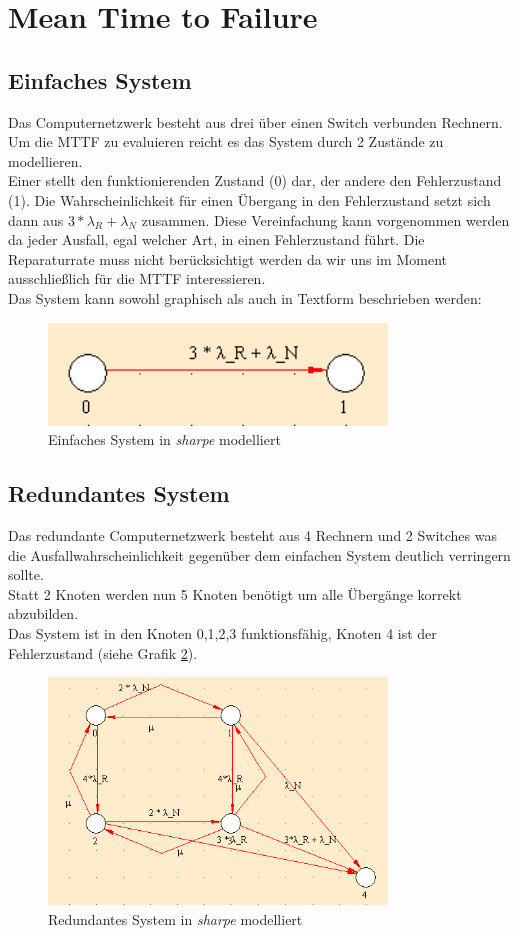 \documentclass[10pt,a4paper]{article}
\begin{document}
\section{Mean Time to Failure} 
\label{sec:mttf}
\subsection{Einfaches System}
Das Computernetzwerk besteht aus drei über einen Switch verbunden Rechnern.
\\
Um die MTTF zu evaluieren reicht es das System durch 2 Zustände zu modellieren. \\
Einer stellt den funktionierenden Zustand (0) dar, der andere den Fehlerzustand (1).
Die Wahrscheinlichkeit für einen Übergang in den Fehlerzustand setzt sich dann aus $3*\lambda_R + \lambda_N$ zusammen. Diese Vereinfachung kann vorgenommen werden da jeder Ausfall, egal welcher Art, in einen Fehlerzustand führt. 
Die Reparaturrate muss nicht berücksichtigt werden da wir uns im Moment ausschließlich für die MTTF interessieren.
\\
Das System kann sowohl graphisch als auch in Textform beschrieben werden:
\begin{figure}[ht!]
\centering
\includegraphics[width=90mm]{MTTM_EinfachesModell.png}
\caption{Einfaches System in \textit{sharpe} modelliert \label{mmtm_einfach}}
\end{figure}


\subsection{Redundantes System}
Das redundante Computernetzwerk besteht aus 4 Rechnern und 2 Switches was die Ausfallwahrscheinlichkeit gegenüber dem einfachen System deutlich verringern sollte.\\
Statt 2 Knoten werden nun 5 Knoten benötigt um alle Übergänge korrekt abzubilden.\\
Das System ist in den Knoten 0,1,2,3 funktionsfähig, Knoten 4 ist der Fehlerzustand (siehe Grafik \ref{mmtm_redundant}).
\begin{figure}[ht!]
\centering
\includegraphics[width=90mm]{MTTM_ReduntantesModell.png}
\caption{Redundantes System in \textit{sharpe} modelliert \label{mmtm_redundant}}
\end{figure}

\newpage
\end{document}
